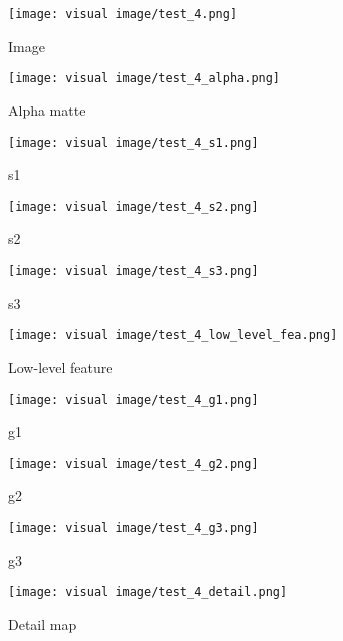 \documentclass[10pt,twocolumn,letterpaper]{article}
\begin{document}
\begin{figure*}
    \centering
    \begin{subfigure}{0.19\linewidth}
        \centerline{\texttt{[image: visual image/test\_4.png]}}
        \caption{Image}
        \label{fig:test_4_image}
    \end{subfigure}
    \centering
    \begin{subfigure}{0.19\linewidth}
        \centerline{\texttt{[image: visual image/test\_4\_alpha.png]}}
        \caption{Alpha matte}
        \label{fig:test_4_image}
    \end{subfigure}
    \centering
    \begin{subfigure}{0.19\linewidth}
        \centerline{\texttt{[image: visual image/test\_4\_s1.png]}}
        \caption{s1}
        \label{fig:test_4_s1}
    \end{subfigure}
    \centering
    \begin{subfigure}{0.19\linewidth}
        \centerline{\texttt{[image: visual image/test\_4\_s2.png]}}
        \caption{s2}
        \label{fig:test_4_s2}
    \end{subfigure}
    \centering
    \begin{subfigure}{0.19\linewidth}
        \centerline{\texttt{[image: visual image/test\_4\_s3.png]}}
        \caption{s3}
        \label{fig:test_4_s3}
    \end{subfigure}
    \centering
    \begin{subfigure}{0.19\linewidth}
        \centerline{\texttt{[image: visual image/test\_4\_low\_level\_fea.png]}}
        \caption{Low-level feature}
        \label{fig:test_4_low_level_fea}
    \end{subfigure}
    \centering
    \begin{subfigure}{0.19\linewidth}
        \centerline{\texttt{[image: visual image/test\_4\_g1.png]}}
        \caption{g1}
        \label{fig:test_4_g1}
    \end{subfigure}
    \centering
    \begin{subfigure}{0.19\linewidth}
        \centerline{\texttt{[image: visual image/test\_4\_g2.png]}}
        \caption{g2}
        \label{fig:test_4_g2}
    \end{subfigure}
    \centering
    \begin{subfigure}{0.19\linewidth}
        \centerline{\texttt{[image: visual image/test\_4\_g3.png]}}
        \caption{g3}
        \label{fig:test_4_g3}
    \end{subfigure}
    \centering
    \begin{subfigure}{0.19\linewidth}
        \centerline{\texttt{[image: visual image/test\_4\_detail.png]}}
        \caption{Detail map}
        \label{fig:test_4_detail}
    \end{subfigure}
\end{figure*}
    
\end{document}
